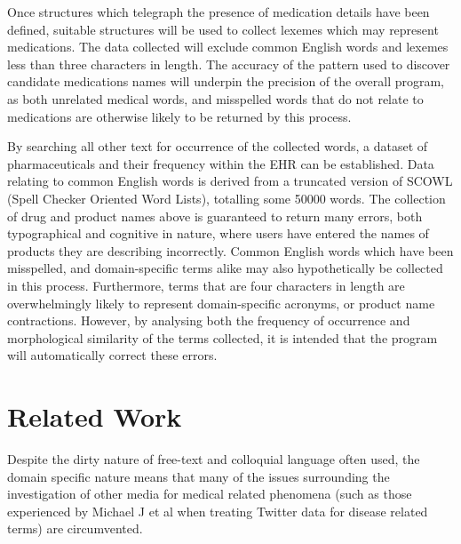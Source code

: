 Once structures which telegraph the presence of medication details have been defined, suitable structures will be used to collect lexemes which may represent medications.  The data collected will exclude common English words and lexemes less than three characters in length. The accuracy of the pattern used to discover candidate medications names will underpin the precision of the overall program, as both unrelated medical words, and misspelled words that do not relate to medications are otherwise likely to be returned by this process.

By searching all other text for occurrence of the collected words, a dataset of pharmaceuticals and their frequency within the EHR can be established. Data relating to common English words is derived from a truncated version of SCOWL (Spell Checker Oriented Word Lists), totalling some 50000 words. The collection of drug and product names above is guaranteed to return many errors, both typographical and cognitive in nature, where users have entered the names of products they are describing incorrectly. Common English words which have been misspelled, and domain-specific terms alike may also hypothetically be collected in this process. Furthermore, terms that are four characters in length are overwhelmingly likely to represent domain-specific acronyms, or product name contractions. However, by analysing both the frequency of occurrence and morphological similarity of the terms collected, it is intended that the program will automatically correct these errors.
 






\section{Related Work}
Despite the dirty nature of free-text and colloquial language often used, the domain specific nature means that many of the issues surrounding the investigation of other media for medical related phenomena (such as those experienced by Michael J et al when treating Twitter data for disease related terms)\cite{paul2012model} are circumvented.

